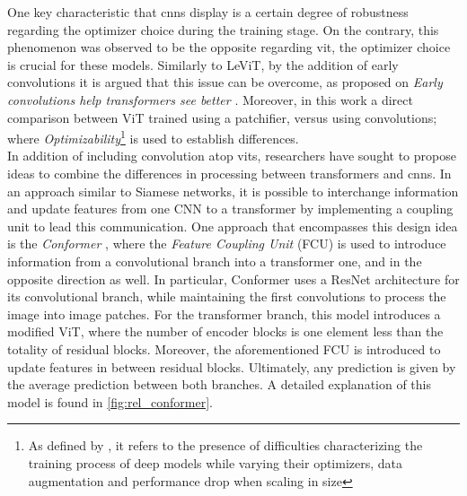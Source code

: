 \noindent One key characteristic that \glspl{cnn} display is a certain degree of robustness 
regarding the optimizer choice during the training stage. On the contrary, this phenomenon was 
observed to be the opposite regarding \gls{vit}, the optimizer choice is crucial for these 
models. Similarly to LeViT, by the addition of early convolutions it is argued that 
this issue can be overcome, as proposed on \emph{Early convolutions help transformers see 
better} \autocite{xiao2021early}. Moreover, in this work a direct comparison between ViT trained 
using a patchifier, versus using convolutions; where \emph{Optimizability}\footnote{As defined by 
\cite{xiao2021early}, it refers to the presence of difficulties characterizing the training 
process of deep models while varying their optimizers, data augmentation and performance drop 
when scaling in size} is used to establish differences.\\



\noindent In addition of including convolution atop \glspl{vit}, researchers have sought to propose 
ideas to combine the differences in processing between transformers and \glspl{cnn}. In an 
approach similar to Siamese networks, it is possible to interchange information and update 
features from one CNN to a transformer by implementing a coupling unit to lead this 
communication. One approach that encompasses this design idea is the \emph{Conformer} \autocite{
peng2021conformer}, where the \emph{Feature Coupling Unit} (FCU) is used to introduce information 
from a convolutional branch into a transformer one, and in the opposite direction as well. In 
particular, Conformer uses a ResNet architecture for its convolutional branch, while 
maintaining the first convolutions to process the image into image patches. For the transformer 
branch, this model introduces a modified ViT, where the number of encoder blocks is one element 
less than the totality of residual blocks. Moreover, the aforementioned FCU is introduced to update 
features in between residual blocks. Ultimately, any prediction is given by the average prediction 
between both branches. A detailed explanation of this model is found in \autoref{fig:rel_conformer}.
